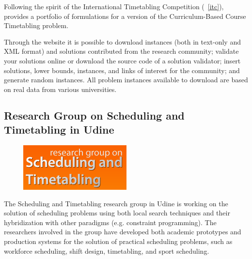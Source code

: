 Following the spirit of the International Timetabling Competition (~\ref{itc}), \cite{Ectt} provides a portfolio of formulations for a version of the Curriculum-Based Course Timetabling problem.

Through the website it is possible to download instances (both in text-only and XML format) and solutions contributed from the research community; validate your solutions online or download the source code of a solution validator; insert solutions, lower bounds, instances, and links of interest for the community; and generate random instances. All problem instances available to download are based on real data from various universities.


\subsection{Research Group on Scheduling and Timetabling in Udine}
\label{satt}

\begin{figure}[h]
\hfill\includegraphics[scale=0.7]{figures/satt.png}
\end{figure}

The Scheduling and Timetabling research group in Udine is working on the solution of scheduling problems using both local search techniques and their hybridization with other paradigms (e.g. constraint programming). The researchers involved in the group have developed both academic prototypes and production systems for the solution of practical scheduling problems, such as workforce scheduling, shift design, timetabling, and sport scheduling.

